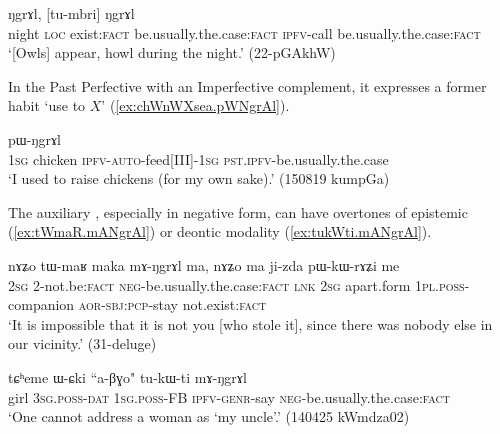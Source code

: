 \begin{exe}
\ex \label{ex:tu.NgrAl}
  ŋgrɤl, [tu-mbri] ŋgrɤl \\
night \textsc{loc} exist:\textsc{fact} be.usually.the.case:\textsc{fact} \textsc{ipfv}-call be.usually.the.case:\textsc{fact} \\
\glt `[Owls] appear, howl during the night.' (22-pGAkhW)
\end{exe}

In the Past Perfective with an Imperfective complement, it expresses a former habit `use to $X$'  (\ref{ex:chWnWXsea.pWNgrAl}).

\begin{exe}
\ex \label{ex:chWnWXsea.pWNgrAl}
  pɯ-ŋgrɤl  \\
\textsc{1sg}  chicken \textsc{ipfv}-\textsc{auto}-feed[III]-\textsc{1sg} \textsc{pst}.\textsc{ipfv}-be.usually.the.case \\
\glt `I used to raise chickens (for my own sake).' (150819 kumpGa)
\end{exe}

The auxiliary , especially in negative form, can have overtones of epistemic (\ref{ex:tWmaR.mANgrAl}) or deontic modality (\ref{ex:tukWti.mANgrAl}).

\begin{exe}
\ex \label{ex:tWmaR.mANgrAl}
 \gll nɤʑo tɯ-maʁ maka mɤ-ŋgrɤl ma, nɤʑo ma ji-zda pɯ-kɯ-rɤʑi me \\
 \textsc{2sg} 2-not.be:\textsc{fact} \textsc{neg}-be.usually.the.case:\textsc{fact} \textsc{lnk} \textsc{2sg} apart.form \textsc{1pl}.\textsc{poss}-companion \textsc{aor}-\textsc{sbj}:\textsc{pcp}-stay not.exist:\textsc{fact} \\
\glt `It is impossible that it is not you [who stole it], since there was nobody else in our vicinity.' (31-deluge)
\end{exe}

\begin{exe}
\ex \label{ex:tukWti.mANgrAl}
 \gll tɕʰeme ɯ-ɕki ``a-βɣo" tu-kɯ-ti mɤ-ŋgrɤl \\
 girl \textsc{3sg}.\textsc{poss}-\textsc{dat} \textsc{1sg}.\textsc{poss}-FB \textsc{ipfv}-\textsc{genr}-say \textsc{neg}-be.usually.the.case:\textsc{fact} \\
\glt `One cannot address a woman as `my uncle'.' (140425 kWmdza02) 
\end{exe} 

